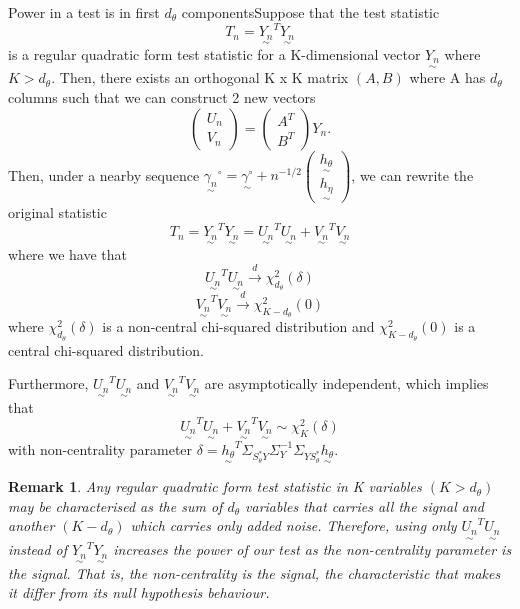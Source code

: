 \documentclass[twoside]{article}
\newtheorem{remark}[theorem]{Remark}
\newcommand{\utilde}{\underset{\sim}}
\begin{document}
\begin{proposition_exam}{Power in a test is in first $d_{\theta}$ components}{}Suppose that the test statistic 
$$
T_n = \utilde{Y_n}^T\utilde{Y_n}
$$
is a regular quadratic form test statistic for a K-dimensional vector $\utilde{Y_n}$ where $K > d_{\theta}.$ Then, there exists an orthogonal K x K matrix $(A , B)$ where A has $d_{\theta}$ columns such that we can construct 2 new vectors 
$$
\begin{pmatrix}
U_n\\
V_n
\end{pmatrix}
= 
\begin{pmatrix}
A^T\\
B^T
\end{pmatrix}Y_n.
$$
Then, under a nearby sequence $\utilde{\gamma_n}^{\circ} = \utilde{\gamma^{\circ}} + n^{-1/2}\begin{pmatrix}\utilde{h_{\theta}}\\\utilde{h_{\eta}} \end{pmatrix}$, we can rewrite the original statistic 
$$
T_n = \utilde{Y_n}^T\utilde{Y_n} = \utilde{U_n}^T\utilde{U_n} + \utilde{V_n}^T\utilde{V_n}
$$
where we have that 
$$
\utilde{U_n}^T\utilde{U_n} \xrightarrow{d} \chi_{d_{\theta}}^{2}(\delta)
$$
$$
\utilde{V_n}^T\utilde{V_n} \xrightarrow{d} \chi_{K - d_{\theta}}^{2}(0)
$$
where $\chi_{d_{\theta}}^{2}(\delta)$ is a non-central chi-squared distribution and $\chi_{K - d_{\theta}}^{2}(0)$ is a central chi-squared distribution.

Furthermore, $\utilde{U_n}^T\utilde{U_n}$ and $\utilde{V_n}^T\utilde{V_n}$ are asymptotically independent, which implies that 
$$
\utilde{U_n}^T\utilde{U_n} + \utilde{V_n}^T\utilde{V_n} \sim \chi_{K}^{2}(\delta)
$$
with non-centrality parameter $\delta  = \utilde{h_{\theta}}^T\Sigma_{S_{\theta}^{*}Y}\Sigma_{Y}^{-1}\Sigma_{YS_{\theta}^{*}}\utilde{h_{\theta}}.$
\end{proposition_exam}

\begin{remark}Any regular quadratic form test statistic in K variables $(K > d_{\theta})$ may be characterised as the sum of $d_{\theta}$ variables that carries all the signal and another $(K - d_{\theta})$ which carries only added noise. Therefore, using only $\utilde{U_n}^T\utilde{U_n}$ instead of $\utilde{Y_n}^T\utilde{Y_n}$ increases the power of our test as the non-centrality parameter is the signal. That is, the non-centrality is the signal, the characteristic that makes it differ from its null hypothesis behaviour.
\end{remark}
\end{document}

